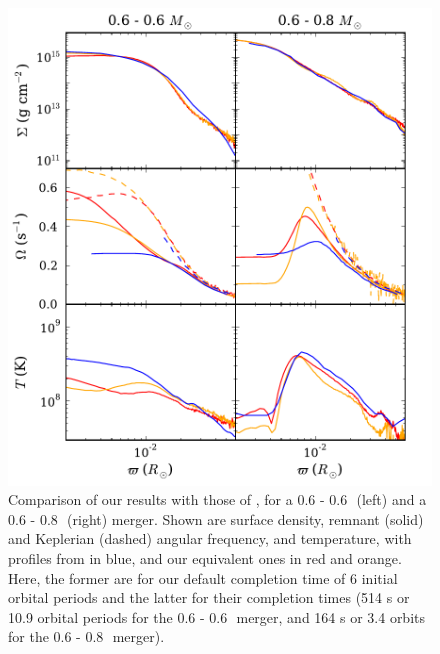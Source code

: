 \begin{figure}
\centering
\includegraphics[angle=0,width=0.7\columnwidth]{chapter2_zhu+13/figures/compwithloreig.pdf}
\caption{Comparison of our results with those of , for a 0.6 - 0.6\,\Msun\ (left) and a 0.6 - 0.8\,\Msun\ (right) merger.  Shown are surface density, remnant (solid) and Keplerian (dashed) angular frequency, and temperature, with profiles from  in blue, and our equivalent ones in red and orange.  Here, the former are for our default completion time of 6 initial orbital periods and the latter for their completion times (514 s or 10.9 orbital periods for the 0.6 - 0.6\,\Msun\ merger, and 164 s or 3.4 orbits for the 0.6 - 0.8\,\Msun\ merger).}
\label{fig:c2_compwithloreig}
\end{figure}


